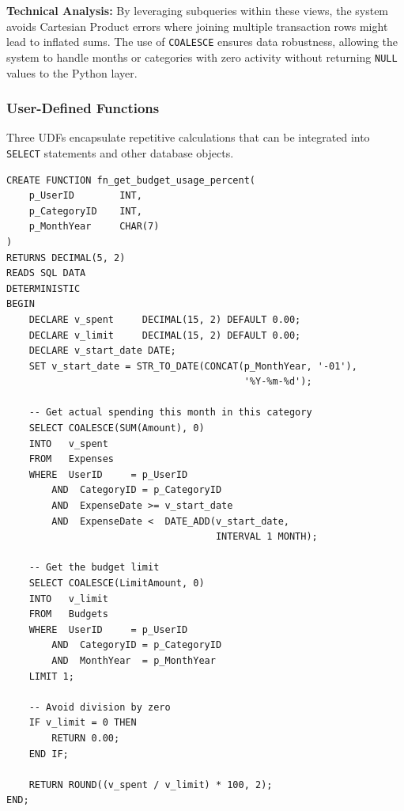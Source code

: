 \documentclass[12pt, a4paper]{article}
\begin{document}
\textbf{Technical Analysis:} By leveraging subqueries within these views, the system
avoids Cartesian Product errors where joining multiple transaction rows might lead to
inflated sums. The use of \texttt{COALESCE} ensures data robustness, allowing the
system to handle months or categories with zero activity without returning \texttt{NULL}
values to the Python layer.

\subsubsection{User-Defined Functions}

Three UDFs encapsulate repetitive calculations that can be integrated into
\texttt{SELECT} statements and other database objects.

\begin{lstlisting}[style=sqlstyle, caption={UDF: fn\_get\_budget\_usage\_percent}]
CREATE FUNCTION fn_get_budget_usage_percent(
    p_UserID        INT,
    p_CategoryID    INT,
    p_MonthYear     CHAR(7)
)
RETURNS DECIMAL(5, 2)
READS SQL DATA
DETERMINISTIC
BEGIN
    DECLARE v_spent     DECIMAL(15, 2) DEFAULT 0.00;
    DECLARE v_limit     DECIMAL(15, 2) DEFAULT 0.00;
    DECLARE v_start_date DATE;
    SET v_start_date = STR_TO_DATE(CONCAT(p_MonthYear, '-01'), 
                                          '%Y-%m-%d');

    -- Get actual spending this month in this category
    SELECT COALESCE(SUM(Amount), 0)
    INTO   v_spent
    FROM   Expenses
    WHERE  UserID     = p_UserID
        AND  CategoryID = p_CategoryID
        AND  ExpenseDate >= v_start_date 
        AND  ExpenseDate <  DATE_ADD(v_start_date, 
                                     INTERVAL 1 MONTH);

    -- Get the budget limit
    SELECT COALESCE(LimitAmount, 0)
    INTO   v_limit
    FROM   Budgets
    WHERE  UserID     = p_UserID
        AND  CategoryID = p_CategoryID
        AND  MonthYear  = p_MonthYear
    LIMIT 1;

    -- Avoid division by zero
    IF v_limit = 0 THEN
        RETURN 0.00;
    END IF;

    RETURN ROUND((v_spent / v_limit) * 100, 2);
END;
\end{lstlisting}
\end{document}
